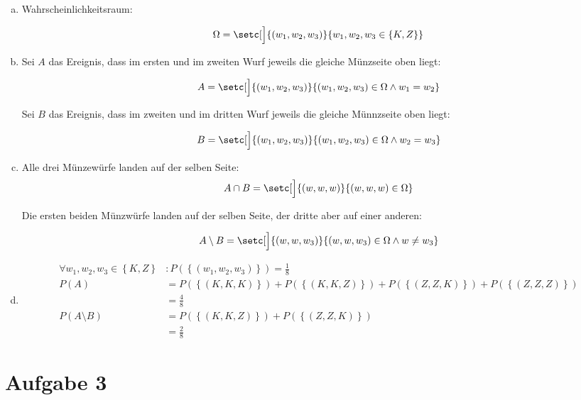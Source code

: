 \documentclass[parskip=half,a4paper]{scrartcl}
\begin{document}
\begin{enumerate}[(a)]
\item Wahrscheinlichkeitsraum:

$$
\Omega = \setc[\Big]{ (w_1, w_2, w_3)}{w_1,w_2,w_3 \in \left\{K,Z\right\}}
$$

\item

Sei $A$ das Ereignis, dass im ersten und im zweiten Wurf jeweils die gleiche Münzseite oben liegt:

$$
A = \setc[\Big]{ (w_1, w_2, w_3)}{(w_1,w_2,w_3) \in \Omega \land w_1 = w_2}
$$

Sei $B$ das Ereignis, dass im zweiten und im dritten Wurf jeweils die gleiche Münnzseite oben liegt:

$$
B = \setc[\Big]{ (w_1, w_2, w_3)}{(w_1,w_2,w_3) \in \Omega \land w_2 = w_3}
$$

\item
Alle drei Münzewürfe landen auf der selben Seite:
$$A \cap B = \setc[\Big]{ (w, w, w)}{(w,w,w) \in \Omega}$$

Die ersten beiden Münzwürfe landen auf der selben Seite, der dritte aber auf einer anderen:

$$A \setminus B = \setc[\Big]{ (w, w, w_3)}{(w,w,w_3) \in \Omega \land w \neq w_3}$$



\item
\begin{align*}
\forall w_1,w_2,w_3 \in \left\{K, Z\right\}&:
P\left(\left\{\left(w_1, w_2, w_3\right)\right\}\right) = \frac{1}{8}\\
P\left(A\right) &= P\left(\left\{\left(K,K,K\right)\right\}\right) + P\left(\left\{\left(K,K,Z\right)\right\}\right) + P\left(\left\{\left(Z,Z,K\right)\right\}\right) + P\left(\left\{\left(Z,Z,Z\right)\right\}\right) \\&= \frac{4}{8}\\
P\left(A \setminus B\right) &= P\left(\left\{\left(K,K,Z\right)\right\}\right) + P\left(\left\{\left(Z,Z,K\right)\right\}\right) \\&= \frac{2}{8}
\end{align*}


\end{enumerate}

\section*{Aufgabe 3}
\end{document}
